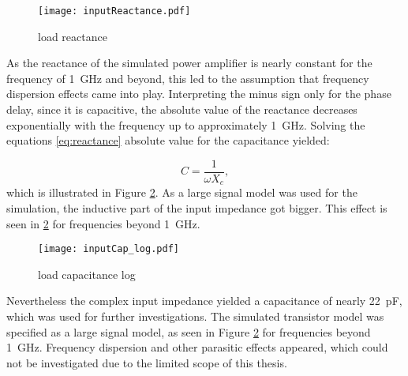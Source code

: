 \begin{figure}[ht]
	\centering
  \texttt{[image: inputReactance.pdf]}
	\caption{load reactance}
	\label{fig:inputReactance}
\end{figure}

As the reactance of the simulated power amplifier is nearly constant for the frequency of \SI{1}{\giga \hertz} and beyond, this led to the assumption that frequency dispersion effects came into play.
Interpreting the minus sign only for the phase delay, since it is capacitive, the absolute value of the reactance decreases exponentially with the frequency up to approximately \SI{1}{\giga \hertz}.
Solving the equations \ref{eq:reactance} absolute value for the capacitance yielded:

\begin{equation}
	C = \frac{1}{\omega X_c},
\end{equation}
which is illustrated in Figure \ref{fig:inputCap_log}.
As a large signal model was used for the simulation, the inductive part of the input impedance got bigger.
This effect is seen in \ref{fig:inputCap_log} for frequencies beyond \SI{1}{\giga \hertz}.
\begin{figure}[ht]
	\centering
  \texttt{[image: inputCap\_log.pdf]}
	\caption{load capacitance log}
	\label{fig:inputCap_log}
\end{figure}

Nevertheless the complex input impedance yielded a capacitance of nearly \SI{22}{\pico \farad}, which was used for further investigations.
The simulated transistor model was specified as a large signal model, as seen in Figure \ref{fig:inputCap_log} for frequencies beyond \SI{1}{\giga \hertz}.
Frequency dispersion and other parasitic effects appeared, which could not be investigated due to the limited scope of this thesis.

%
%
%

